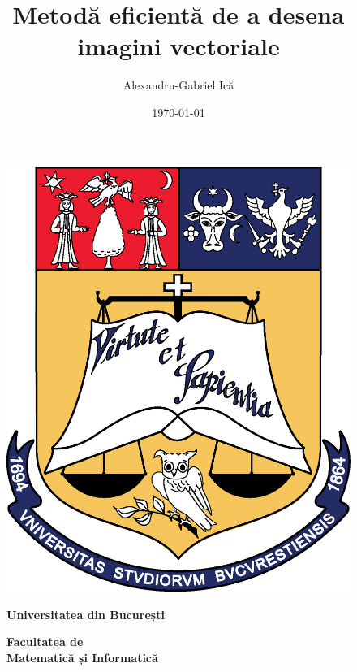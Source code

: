 \documentclass[a4paper, 12pt]{report}
\title{Metodă eficientă de a desena imagini vectoriale}
\author{Alexandru-Gabriel Ică}
\date{\today}
\begin{document}
\begin{titlepage}
    \begin{figure}[!htb]
        \centering
        \begin{minipage}{0.19\textwidth}
            \includegraphics[width=\linewidth]{img/UB_Logo.png}
        \end{minipage}
        \begin{minipage}{0.57\textwidth}
            \large
            \vspace{0.2cm}
            \begin{center}
                \textbf{Universitatea din București}
            \end{center}
            \vspace{0.3cm}
            \begin{center}
                \textbf{
                    Facultatea de \\
                    Matematică și Informatică
                }
            \end{center}
        \end{minipage}

\end{figure}
\end{titlepage}
\end{document}
